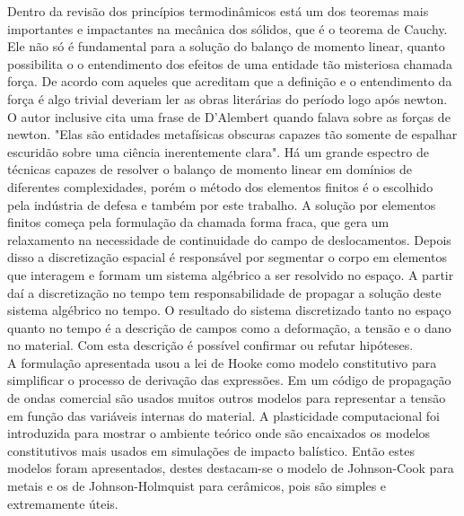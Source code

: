 Dentro da revisão dos princípios termodinâmicos está um dos teoremas mais importantes e impactantes na mecânica dos sólidos, que é o teorema de Cauchy. Ele não só é fundamental para a solução do balanço de momento linear, quanto possibilita o o entendimento dos efeitos de uma entidade tão misteriosa chamada força. De acordo com \cite{gurtin_fried_anand_2013} aqueles que acreditam que a definição e o entendimento da força é algo trivial deveriam ler as obras literárias do período logo após newton. O autor inclusive cita uma frase de D'Alembert quando falava sobre as forças de newton. "Elas são entidades metafísicas obscuras capazes tão somente de espalhar escuridão sobre uma ciência inerentemente clara". Há um grande espectro de técnicas capazes de resolver o balanço de momento linear em domínios de  diferentes complexidades, porém o método dos elementos finitos é o escolhido pela indústria de defesa e também por este trabalho. A solução por elementos finitos começa pela formulação da chamada forma fraca, que gera um relaxamento na necessidade de continuidade do campo de deslocamentos. Depois disso a discretização espacial é responsável por segmentar o corpo em elementos que interagem e formam um sistema algébrico a ser resolvido no espaço. A partir daí a discretização no tempo tem responsabilidade de propagar a solução deste sistema algébrico no tempo. O resultado do sistema discretizado tanto no espaço quanto no tempo é a descrição de campos como a deformação, a tensão e o dano no material. Com esta descrição é possível confirmar ou refutar hipóteses. \\

A formulação apresentada usou a lei de Hooke como modelo constitutivo para simplificar o processo de derivação das expressões. Em um código de propagação de ondas comercial são usados muitos outros modelos para representar a tensão em função das variáveis internas do material. A plasticidade computacional foi introduzida para mostrar o ambiente teórico onde são encaixados os modelos constitutivos mais usados em simulações de impacto balístico. Então estes modelos foram apresentados, destes destacam-se o modelo de Johnson-Cook para metais e os de Johnson-Holmquist para cerâmicos, pois são simples e extremamente úteis.\\

